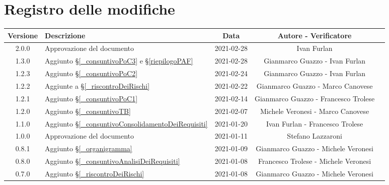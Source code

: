 \section*{Registro delle modifiche}

\begin{center}
	\begin{longtable}{|c|p{5cm}|c|c|c|}
		\hline
		\rowcolor{lighter-grayer}
		\textbf{Versione} & \textbf{Descrizione} & \textbf{Data} & \textbf{Autore - Verificatore} \\
		\hline
		\endfirsthead


		\hline
		2.0.0 & Approvazione del documento & 2021-02-28 & Ivan Furlan \\
		1.3.0 & Aggiunto \S\ref{_consuntivoPoC3} e \S\ref{riepilogoPAF} & 2021-02-28 & Gianmarco Guazzo - Ivan Furlan\\
		1.2.3 & Aggiunto \S\ref{_consuntivoPoC2} & 2021-02-24 & Gianmarco Guazzo - Ivan Furlan\\
		1.2.2 & Aggiunte a \S\ref{_riscontroDeiRischi} & 2021-02-22 & Gianmarco Guazzo - Marco Canovese \\
		1.2.1 & Aggiunto \S\ref{_consuntivoPoC1} & 2021-02-14 & Gianmarco Guazzo - Francesco Trolese\\
		1.2.0 & Aggiunto \S\ref{_consuntivoTB} & 2021-02-07 & Michele Veronesi - Marco Canovese\\
		1.1.0 & Aggiunto \S\ref{_consuntivoConsolidamentoDeiRequisiti} & 2021-01-20 & Ivan Furlan - Francesco Trolese \\
		1.0.0 & Approvazione del documento & 2021-01-11 & Stefano Lazzaroni \\
		0.8.1 & Aggiunto \S\ref{_organigramma} & 2021-01-09 & Gianmarco Guazzo - Michele Veronesi \\
		0.8.0 & Aggiunto \S\ref{_consuntivoAnalisiDeiRequisiti} & 2021-01-08 & Francesco Trolese - Michele Veronesi \\
		0.7.0 & Aggiunto \S\ref{_riscontroDeiRischi} & 2021-01-08 & Gianmarco Guazzo - Michele Veronesi \\

\end{longtable}
\end{center}
